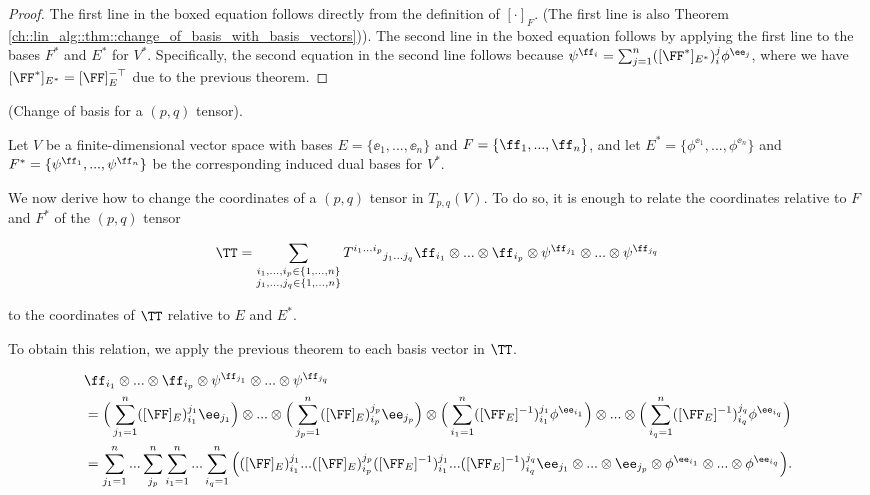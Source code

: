 \begin{proof}
    The first line in the boxed equation follows directly from the definition of $[\cdot]_F$. (The first line is also Theorem \ref{ch::lin_alg::thm::change_of_basis_with_basis_vectors})). The second line in the boxed equation follows by applying the first line to the bases $F^*$ and $E^*$ for $V^*$. Specifically, the second equation in the second line follows because $\psi^{\ff_i} = \sum_{j = 1}^n ([\FF^*]_{E^*})^j_i \phi^{\ee_j}$, where we have $[\FF^*]_{E^*} = [\FF]_E^{-\top}$ due to the previous theorem.
\end{proof}

\begin{theorem}
\label{ch::bilinear_forms_metric_tensors::thm::ricci}

    (Change of basis for a $(p, q)$ tensor). 
    
    Let $V$ be a finite-dimensional vector space with bases $E = \{\ee_1, ..., \ee_n\}$ and $F = \{\ff_1, ..., \ff_n\}$, and let $E^* = \{\phi^{\ee_1}, ..., \phi^{\ee_n}\}$ and $F^* = \{\psi^{\ff_1}, ..., \psi^{\ff_n}\}$ be the corresponding induced dual bases for $V^*$.
    
    We now derive how to change the coordinates of a $(p, q)$ tensor in $T_{p,q}(V)$. To do so, it is enough to relate the coordinates relative to $F$ and $F^*$ of the $(p, q)$ tensor

    \begin{align*}
       \TT = \sum_{\substack{i_1, ..., i_p \in \{1, ..., n\} \\ j_1, ..., j_q \in \{1, ..., n\}}}
       T^{i_1 ... i_p}{}_{j_1 ... j_q} \ff_{i_1} \otimes ... \otimes \ff_{i_p} \otimes \psi^{\ff_{j_1}} \otimes ... \otimes \psi^{\ff_{j_q}}
    \end{align*}
    
    to the coordinates of $\TT$ relative to $E$ and $E^*$.
    
    To obtain this relation, we apply the previous theorem to each basis vector in $\TT$.
    
    \begin{align*}
        &\ff_{i_1} \otimes ... \otimes \ff_{i_p} \otimes \psi^{\ff_{j_1}} \otimes ... \otimes \psi^{\ff_{j_q}} \\
        &= \Big(\sum_{j_1 = 1}^n ([\FF]_E)^{j_1}_{i_1} \ee_{j_1} \Big) \otimes ... \otimes \Big(\sum_{j_p = 1}^n ([\FF]_E)^{j_p}_{i_p} \ee_{j_p} \Big)
        \otimes
        \Big( \sum_{i_1 = 1}^n ([\FF_E]^{-1})^{j_1}_{i_1} \phi^{\ee_{i_1}} \Big) \otimes
        ... \otimes \Big( \sum_{i_q = 1}^n ([\FF_E]^{-1})^{j_q}_{i_q} \phi^{\ee_{i_q}} \Big) \\
        &= \sum_{j_1 = 1}^n ... \sum_{j_p}^n \sum_{i_1 = 1}^n ... \sum_{i_q = 1}^n \Big( ([\FF]_E)^{j_1}_{i_1} ... ([\FF]_E)^{j_p}_{i_p}
        ([\FF_E]^{-1})^{j_1}_{i_1} ... ([\FF_E]^{-1})^{j_q}_{i_q} 
        \ee_{j_1} \otimes ... \otimes \ee_{j_p} \otimes \phi^{\ee_{i_1}} \otimes ... \otimes \phi^{\ee_{i_q}} \Big).
    \end{align*}
    

\end{theorem}
